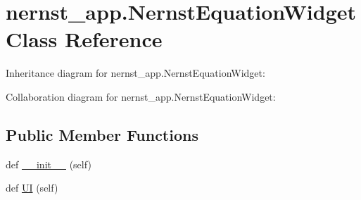 \hypertarget{classnernst__app_1_1NernstEquationWidget}{}\section{nernst\+\_\+app.\+Nernst\+Equation\+Widget Class Reference}
\label{classnernst__app_1_1NernstEquationWidget}


Inheritance diagram for nernst\+\_\+app.\+Nernst\+Equation\+Widget\+:


Collaboration diagram for nernst\+\_\+app.\+Nernst\+Equation\+Widget\+:
\subsection*{Public Member Functions}
\begin{DoxyCompactItemize}
\item 
def \hyperlink{classnernst__app_1_1NernstEquationWidget_a4e597f2b3dfd4e628c06b99c80f0178f}{\+\_\+\+\_\+init\+\_\+\+\_\+} (self)
\item 
def \hyperlink{classnernst__app_1_1NernstEquationWidget_a883d90598b1a75b6b4f9eac8f31e39fa}{UI} (self)
\end{DoxyCompactItemize}
